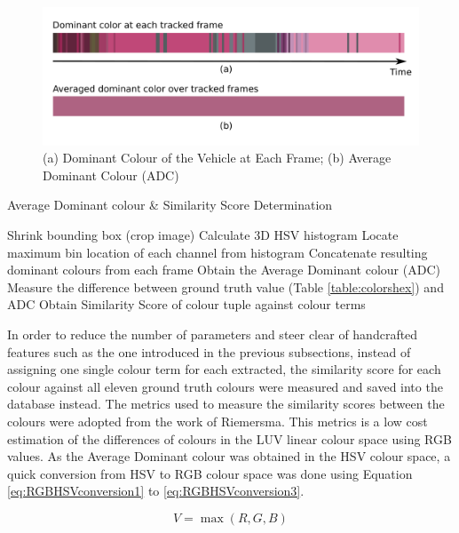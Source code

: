 \begin{figure}[hbt!]\centering
\includegraphics[width=.9\textwidth]{image/general/ADC.png}
\caption{(a) Dominant Colour of the Vehicle at Each Frame; (b) Average Dominant Colour (ADC)}
\label{fig:ADC}
\end{figure}

\begin{algorithm}[H]
  \caption{Average Dominant colour \& Similarity Score Determination}
  \label{algo:ADC}
  \begin{algorithmic}[1]
        \STATE Shrink bounding box (crop image)
        \STATE Calculate 3D HSV histogram
        \STATE Locate maximum bin location of each channel from histogram
        \STATE Concatenate resulting dominant colours from each frame
        \STATE Obtain the Average Dominant colour (ADC)
        \STATE Measure the difference between ground truth value (Table \ref{table:colorshex}) and ADC 
        \STATE Obtain Similarity Score of colour tuple against colour terms
    \ENDFOR
  \end{algorithmic}
\end{algorithm}

In order to reduce the number of parameters and steer clear of handcrafted features such as the one introduced in the previous subsections, instead of assigning one single colour term for each extracted, the similarity score for each colour against all eleven ground truth colours were measured and saved into the database instead. The metrics used to measure the similarity scores between the colours were adopted from the work of Riemersma\cite{riemersma}. This metrics is a low cost estimation of the differences of colours in the LUV linear colour space using RGB values. As the Average Dominant colour was obtained in the HSV colour space, a quick conversion from HSV to RGB colour space was done using Equation \ref{eq:RGBHSVconversion1} to \ref{eq:RGBHSVconversion3}. 


\begin{equation}
\label{eq:RGBHSVconversion1}
V = \max(R,G,B) 
\end{equation}

